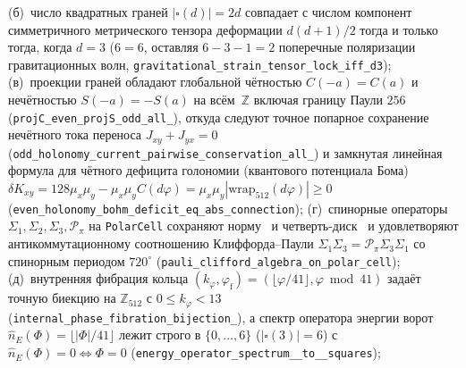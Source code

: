 \begin{enumerate}[nosep,leftmargin=*]
  (б)~число квадратных граней $|\square(d)|=2d$ совпадает с числом компонент симметричного метрического тензора деформации $d(d+1)/2$ тогда и только тогда, когда $d=3$ ($6=6$, оставляя $6-3-1=2$ поперечные поляризации гравитационных волн, \texttt{gravitational\_\allowbreak strain\_\allowbreak tensor\_\allowbreak lock\_\allowbreak iff\_\allowbreak d3});
  (в)~проекции граней обладают глобальной чётностью $C(-a)=C(a)$ и нечётностью $S(-a)=-S(a)$ на всём~$\mathbb{Z}$ включая границу Паули $256$ (\texttt{projC\_\allowbreak even\_\allowbreak projS\_\allowbreak odd\_\allowbreak all\_}), откуда следуют точное попарное сохранение нечётного тока переноса $J_{xy}+J_{yx}=0$ (\texttt{odd\_\allowbreak holonomy\_\allowbreak current\_\allowbreak pairwise\_\allowbreak conservation\_\allowbreak all\_}) и замкнутая линейная формула для чётного дефицита голономии (квантового потенциала Бома) $\delta K_{xy} = 128\mu_x\mu_y - \mu_x\mu_y C(d\varphi) = \mu_x\mu_y|\mathrm{wrap}_{512}(d\varphi)|\ge 0$ (\texttt{even\_\allowbreak holonomy\_\allowbreak bohm\_\allowbreak deficit\_\allowbreak eq\_\allowbreak abs\_\allowbreak connection});
  (г)~спинорные операторы $\Sigma_1,\Sigma_2,\Sigma_3,\mathcal{P}_\pi$ на \texttt{PolarCell} сохраняют норму~ и четверть-диск~ и удовлетворяют антикоммутационному соотношению Клиффорда--Паули $\Sigma_1\Sigma_3 = \mathcal{P}_\pi\Sigma_3\Sigma_1$ со спинорным периодом $720^\circ$ (\texttt{pauli\_\allowbreak clifford\_\allowbreak algebra\_\allowbreak on\_\allowbreak polar\_\allowbreak cell});
  (д)~внутренняя фибрация кольца $(k_\varphi,\varphi_{\mathrm{f}})=(\lfloor\varphi/41\rfloor,\varphi\bmod 41)$ задаёт точную биекцию на $\mathbb{Z}_{512}$ с $0\le k_\varphi < 13$ (\texttt{internal\_\allowbreak phase\_\allowbreak fibration\_\allowbreak bijection\_}), а спектр оператора энергии ворот $\widehat{n}_E(\Phi)=\lfloor|\Phi|/41\rfloor$ лежит строго в $\{0,\dots,6\}$ ($|\square(3)|=6$) с $\widehat{n}_E(\Phi)=0\iff\Phi=0$ (\texttt{energy\_\allowbreak operator\_\allowbreak spectrum\_\_\allowbreak to\_\_\allowbreak squares});

\end{enumerate}
